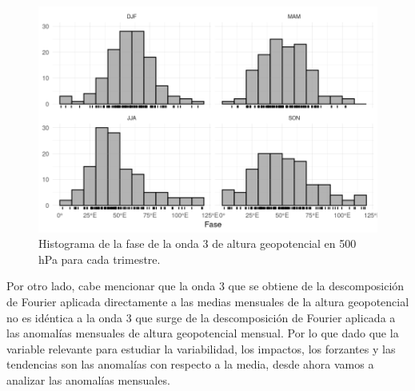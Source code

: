 \documentclass[12pt,oneside,a4paper]{reedthesis}
\begin{document}
\begin{figure}

{\centering \includegraphics{figures/15-onda3/fase-histogram-1} 

}

\caption{Histograma de la fase de la onda 3 de altura geopotencial en 500 hPa para cada trimestre.}\label{fig:fase-histogram}
\end{figure}



Por otro lado, cabe mencionar que la onda 3 que se obtiene de la descomposición de Fourier aplicada directamente a las medias mensuales de la altura geopotencial no es idéntica a la onda 3 que surge de la descomposición de Fourier aplicada a las anomalías mensuales de altura geopotencial mensual.
Por lo que dado que la variable relevante para estudiar la variabilidad, los impactos, los forzantes y las tendencias son las anomalías con respecto a la media, desde ahora vamos a analizar las anomalías mensuales.
\end{document}
